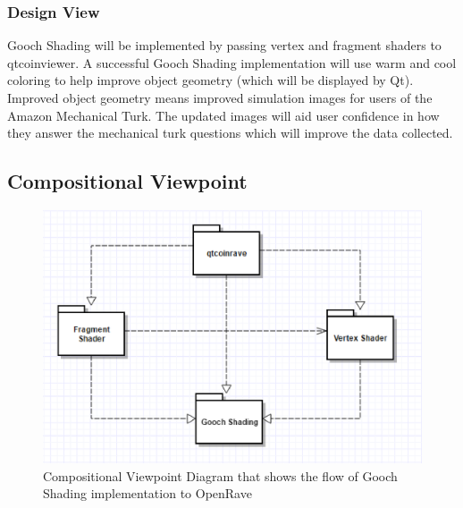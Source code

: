 ﻿\documentclass[10pt,journal,compsoc,draftclsnofoot]{IEEEtran}
\begin{document}
\begin{flushleft}
\subsubsection{Design View}
Gooch Shading will be implemented by passing vertex and fragment shaders to qtcoinviewer.
A successful Gooch Shading implementation will use warm and cool coloring to help improve object geometry (which will be displayed by Qt).
Improved object geometry means improved simulation images for users of the Amazon Mechanical Turk.
The updated images will aid user confidence in how they answer the mechanical turk questions which will improve the data collected.

\subsection{Compositional Viewpoint}

\begin{figure} [H]
  \includegraphics[scale=0.9]{Gooch_Shading2_composition.eps}
  \caption
{ \newline \hspace{\linewidth}
Compositional Viewpoint Diagram that shows the flow of Gooch Shading implementation to OpenRave}
  \label{fig:Gooch_Shading2_composition}
\end{figure}


\end{flushleft}
\end{document}
